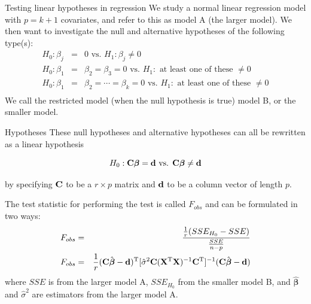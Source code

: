 \documentclass[
  ignorenonframetext,
]{beamer}
\begin{document}
\begin{frame}{Testing linear hypotheses in regression}
\label{testing-linear-hypotheses-in-regression}
We study a normal linear regression model with \(p=k+1\) covariates, and
refer to this as model A (the larger model). We then want to investigate
the null and alternative hypotheses of the following type(s):
\begin{eqnarray*}
 H_0: \beta_{j}&=&0 \text{ vs. } H_1:\beta_j\neq 0\\
 H_0: \beta_{1}&=&\beta_{2}=\beta_{3}=0 \text{ vs. } H_1:\text{ at least one of these }\neq 0\\
 H_0: \beta_{1}&=&\beta_{2}=\cdots=\beta_{k}=0 \text{ vs. } H_1:\text{ at least one of these }\neq 0\\
 \end{eqnarray*} We call the restricted model (when the null hypothesis
is true) model B, or the smaller model.
\end{frame}

\begin{frame}{Hypotheses}
\label{hypotheses}
These null hypotheses and alternative hypotheses can all be rewritten as
a linear hypothesis

\[
H_0: {\bf C}{\boldsymbol \beta}={\bf d} \text{ vs. } {\bf C}{\boldsymbol \beta}\neq {\bf d}
\]

by specifying \({\bf C}\) to be a \(r \times p\) matrix and \({\bf d}\)
to be a column vector of length \(p\).

The test statistic for performing the test is called \(F_{obs}\) and can
be formulated in two ways: \begin{eqnarray}
F_{obs}&=&\frac{\frac{1}{r} (SSE_{H_0}-SSE)}{\frac{SSE}{n-p}} \label{Fobsnested}\\
F_{obs}&=&\frac{1}{r}({\bf C}\hat{ {\boldsymbol \beta}}-{\bf d})^{\text T}[\hat{\sigma}^2 {\bf C}({\bf X}^{\text T}{\bf X})^{-1}{\bf C}^{\text T}]^{-1}({\bf C}\hat{ {\boldsymbol \beta}}-{\bf d}) \label{FobsCbeta}
\end{eqnarray} where \(SSE\) is from the larger model A, \(SSE_{H_0}\)
from the smaller model B, and \(\hat{ {\boldsymbol \beta}}\) and
\(\hat{\sigma}^2\) are estimators from the larger model A.
\end{frame}
\end{document}
